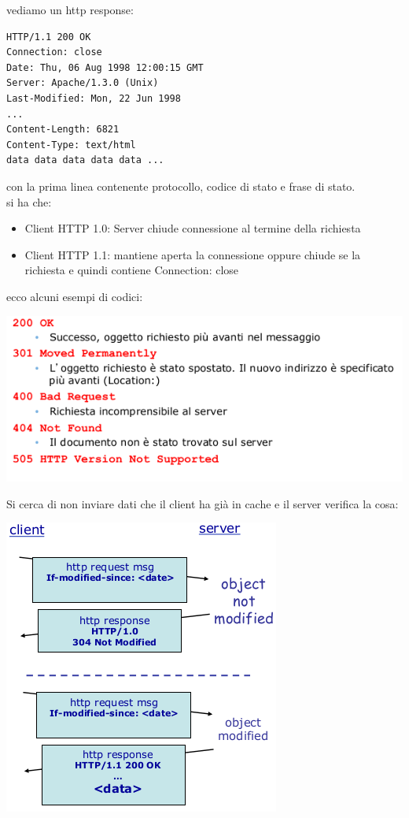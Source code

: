 \documentclass[a4paper,12pt, oneside]{book}
\begin{document}
vediamo un http response:
\begin{verbatim}
HTTP/1.1 200 OK
Connection: close
Date: Thu, 06 Aug 1998 12:00:15 GMT
Server: Apache/1.3.0 (Unix)
Last-Modified: Mon, 22 Jun 1998
...
Content-Length: 6821
Content-Type: text/html
data data data data data ...
\end{verbatim}
con la prima linea contenente protocollo, codice di stato e frase di stato.\\ 
si ha che:
\begin{itemize}
\item Client HTTP 1.0: Server chiude connessione al termine della richiesta
\item Client HTTP 1.1: mantiene aperta la connessione oppure chiude se la richiesta e quindi
contiene Connection: close
\end{itemize}
ecco alcuni esempi di codici:
\begin{center}
\includegraphics[scale=0.7]{img/http3.png}
\end{center}
Si cerca di non inviare dati che il client ha già in cache e il server verifica la cosa:
\begin{center}
\includegraphics[scale=0.7]{img/http4.png}
\end{center}
\end{document}
